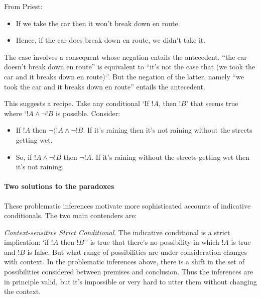 \documentclass[../../../include/open-logic-section]{subfiles}
\begin{document}
From Priest:

\begin{itemize}
	\item If we take the car then it won’t break down en route. 
	\item Hence, if the car does break down en route, we didn’t take it.
\end{itemize}

The case involves a consequent whose negation entails the antecedent. ``the car doesn't break down en route'' is equivalent to ``it's not the case that (we took the car and it breaks down en route)`'. But the negation of the latter, namely ``we took the car and it breaks down en route'' entails the antecedent.

This suggests a recipe. Take any conditional `If $!A$, then $!B$' that seems true where `$!A \land \lnot !B$ is possible. Consider:

\begin{itemize}
	\item If $!A$ then $\lnot (!A \land \lnot !B$. If it's raining then it's not raining without the streets getting wet. 
	\item So, if $!A \land \lnot !B$ then $\lnot !A$. If it's raining without the streets getting wet then it's not raining. 
\end{itemize}

\paragraph*{Two solutions to the paradoxes}

These problematic inferences motivate more sophisticated accounts of indicative conditionals. The two main contenders are:

\emph{Context-sensitive Strict Conditional}. The indicative conditional is a strict implication: `if $!A$ then $!B$'' is true that there's no possibility in which $!A$ is true and $!B$ is false. But what range of possibilities are under consideration changes with context. In the problematic inferences above, there is a shift in the set of possibilities considered between premises and conclusion. Thus the inferences are in principle valid, but it's impossible or very hard to utter them without changing the context. 

\end{document}
